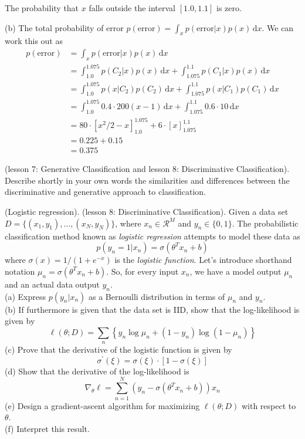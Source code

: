 \documentclass[a4paper]{article}
\def\d#1{{\,\mathrm{d}#1}}
\begin{document}
\begin{ExerciseList}
The probability that $x$ falls outside the interval $[1.0,1.1]$ is zero.


\medskip
(b) The total probability of error $p(\text{error})=\int_x p(\text{error}|x)p(x)\d{x}$. We can work this out as
\begin{align*}
p(\text{error}) &= \int_x p(\text{error}|x)p(x)\d{x}\\
&= \int_{1.0}^{1.075} p(C_2|x)p(x)\d{x} + \int_{1.075}^{1.1} p(C_1|x)p(x)\d{x}\\
&= \int_{1.0}^{1.075} p(x|C_2)p(C_2)\d{x} + \int_{1.075}^{1.1} p(x|C_1)p(C_1)\d{x}\\
&= \int_{1.0}^{1.075}0.4\cdot 200(x-1)\d{x} + \int_{1.075}^{1.1} 0.6\cdot 10\d{x}\\
&=80\cdot[x^2/2-x]_{1.0}^{1.075} + 6\cdot[x]_{1.075}^{1.1}\\
&=0.225 + 0.15\\
&=0.375
\end{align*}



\Exercise[label={ex:discr-gen}] (lesson 7: Generative Classification and lesson 8: Discriminative Classification). Describe shortly in your own words the similarities and differences between the discriminative and generative approach to classification.



\Exercise[label={ex:logistic-regression}] (Logistic regression). (lesson 8: Discriminative Classification). Given a data set $D=\{(x_1,y_1),\ldots,(x_N,y_N)\}$, where $x_n \in \mathcal{R}^M$ and $y_n \in \{0,1\}$. The probabilistic classification method known as \emph{logistic regression} attempts to model these data as
$$p(y_n=1|x_n) = \sigma(\theta^T x_n + b)$$
where $\sigma(x) = 1/(1+e^{-x})$ is the \emph{logistic function}. Let's introduce shorthand notation $\mu_n=\sigma(\theta^T x_n + b)$. So, for every input $x_n$, we have a model output $\mu_n$ and an actual data output $y_n$.\\

(a) Express $p(y_n|x_n)$ as a Bernoulli distribution in terms of $\mu_n$ and $y_n$.\\
(b) If furthermore is given that the data set is IID, show that the log-likelihood is given by
$$
\ell(\theta;D) = \sum_n \left\{y_n \log \mu_n  + (1-y_n)\log(1-\mu_n)\right\}
$$
(c) Prove that the derivative of the logistic function is given by
$$
\sigma^\prime(\xi) = \sigma(\xi)\cdot\left[1-\sigma(\xi)\right]
$$
(d) Show that the derivative of the log-likelihood is
$$
\nabla_\theta \ell = \sum_{n=1}^N \left( y_n - \sigma(\theta^T x_n +b)\right)x_n
$$
(e) Design a gradient-ascent algorithm for maximizing $\ell(\theta;D)$ with respect to $\theta$.\\
(f) Interpret this result.


\end{ExerciseList}
\end{document}
